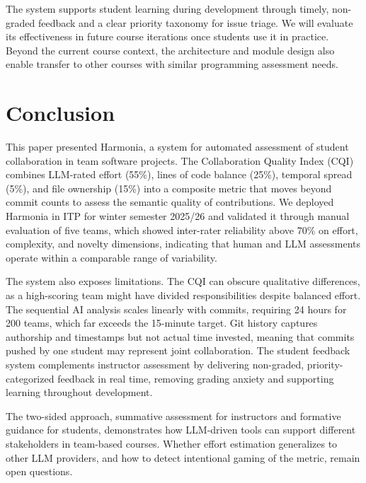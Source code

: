 \documentclass[sigconf]{acmart}
\begin{document}
The system supports student learning during development through timely, non-graded feedback and a clear priority taxonomy for issue triage. We will evaluate its effectiveness in future course iterations once students use it in practice. Beyond the current course context, the architecture and module design also enable transfer to other courses with similar programming assessment needs.

\section{Conclusion}

This paper presented Harmonia, a system for automated assessment of student collaboration in team software projects. The Collaboration Quality Index (CQI) combines LLM-rated effort (55\%), lines of code balance (25\%), temporal spread (5\%), and file ownership (15\%) into a composite metric that moves beyond commit counts to assess the semantic quality of contributions. We deployed Harmonia in ITP for winter semester 2025/26 and validated it through manual evaluation of five teams, which showed inter-rater reliability above 70\% on effort, complexity, and novelty dimensions, indicating that human and LLM assessments operate within a comparable range of variability.

The system also exposes limitations. The CQI can obscure qualitative differences, as a high-scoring team might have divided responsibilities despite balanced effort. The sequential AI analysis scales linearly with commits, requiring 24 hours for 200 teams, which far exceeds the 15-minute target. Git history captures authorship and timestamps but not actual time invested, meaning that commits pushed by one student may represent joint collaboration. The student feedback system complements instructor assessment by delivering non-graded, priority-categorized feedback in real time, removing grading anxiety and supporting learning throughout development.

The two-sided approach, summative assessment for instructors and formative guidance for students, demonstrates how LLM-driven tools can support different stakeholders in team-based courses. Whether effort estimation generalizes to other LLM providers, and how to detect intentional gaming of the metric, remain open questions.

\end{document}
